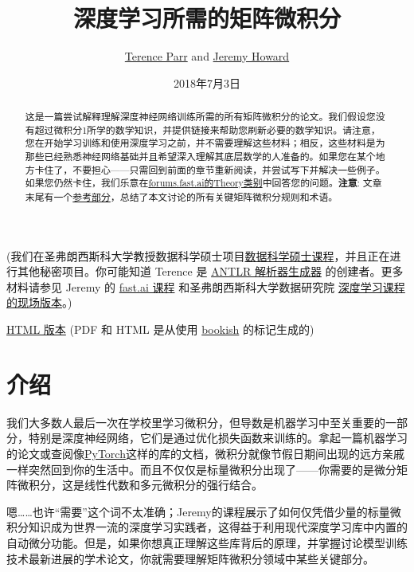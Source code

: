 \documentclass[11pt]{article}
\title{深度学习所需的矩阵微积分}
\author{
\href{http://explained.ai}{Terence Parr} and \href{http://www.fast.ai/about/\#jeremy}{Jeremy Howard}
}
\date{2018年7月3日}
\begin{document}
\maketitle


(我们在圣弗朗西斯科大学教授数据科学硕士项目\href{https://www.usfca.edu/arts-sciences/graduate-programs/data-science}{数据科学硕士课程}，并且正在进行其他秘密项目。你可能知道 Terence 是 \href{http://www.antlr.org}{ANTLR 解析器生成器} 的创建者。更多材料请参见 Jeremy 的 \href{http://course.fast.ai}{fast.ai 课程} 和圣弗朗西斯科大学数据研究院 \href{https://www.usfca.edu/data-institute/certificates/deep-learning-part-one}{深度学习课程的现场版本}。)

\href{http://explained.ai/matrix-calculus/index.html}{HTML 版本} (PDF 和 HTML 是从使用 \href{https://github.com/parrt/bookish}{bookish} 的标记生成的)


\begin{abstract}

这是一篇尝试解释理解深度神经网络训练所需的所有矩阵微积分的论文。我们假设您没有超过微积分1所学的数学知识，并提供链接来帮助您刷新必要的数学知识。请注意，您在开始学习训练和使用深度学习之前，并不需要理解这些材料；相反，这些材料是为那些已经熟悉神经网络基础并且希望深入理解其底层数学的人准备的。如果您在某个地方卡住了，不要担心——只需回到前面的章节重新阅读，并尝试写下并解决一些例子。如果您仍然卡住，我们乐意在\href{http://forums.fast.ai/c/theory}{forums.fast.ai的Theory类别}中回答您的问题。{\bf 注意}: 文章末尾有一个\href{\#reference}{参考部分}，总结了本文讨论的所有关键矩阵微积分规则和术语。

\end{abstract}

\pagebreak
{\small \setlength{\parskip}{0pt} \tableofcontents}
\pagebreak


\section{介绍}\label{intro}


我们大多数人最后一次在学校里学习微积分，但导数是机器学习中至关重要的一部分，特别是深度神经网络，它们是通过优化损失函数来训练的。拿起一篇机器学习的论文或查阅像\href{http://pytorch.org}{PyTorch}这样的库的文档，微积分就像节假日期间出现的远方亲戚一样突然回到你的生活中。而且不仅仅是标量微积分出现了——你需要的是微分矩阵微积分，这是线性代数和多元微积分的强行结合。

嗯……也许“需要”这个词不太准确；Jeremy的课程展示了如何仅凭借少量的标量微积分知识成为世界一流的深度学习实践者，这得益于利用现代深度学习库中内置的自动微分功能。但是，如果你想真正理解这些库背后的原理，并掌握讨论模型训练技术最新进展的学术论文，你就需要理解矩阵微积分领域中某些关键部分。
\end{document}
